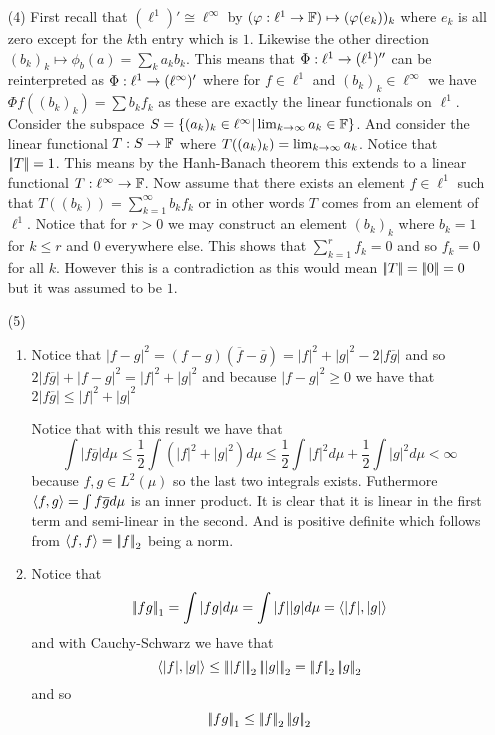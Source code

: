 \documentclass[12pt]{amsart}
\begin{document}
\begin{itemize}
\begin{enumerate}[label=(\alph*)]
   \end{enumerate}

   \item[(4)] %
   First recall that $(\ell^1)'\cong \ell^\infty$ by 
   $(\varphi:\ell^1\rightarrow \mathbb{F})\mapsto(\varphi(e_k))_k$ where $e_k$ is all zero except for the $k$th entry which is $1$.
   Likewise the other direction $(b_k)_k\mapsto \phi_b(a)=\sum_ka_kb_k$. This means that $\Phi:\ell^1\rightarrow (\ell^1)''$ 
   can be reinterpreted as $\Phi:\ell^1\rightarrow (\ell^\infty)'$ where for $f\in\ell^1$ and $(b_k)_k\in\ell^\infty$ we have $\Phi f ((b_k)_k)=\sum b_k f_k$ as these are exactly the linear functionals on $\ell^1$.
   Consider the subspace $S=\{(a_k)_k\in\ell^\infty| \lim_{k\rightarrow\infty}a_k\in\mathbb{F}\}$. 
   And consider the linear functional
   $T:S\rightarrow\mathbb{F}$ where $T((a_k)_k)=\lim_{k\rightarrow \infty}a_k$. Notice that $\norm{T}=1$. This means
   by the Hanh-Banach theorem this extends to a linear functional $T:\ell^\infty\rightarrow \mathbb{F}$.
   Now assume that there exists an element $f\in\ell^1$ such that $T((b_k))=\sum_{k=1}^\infty b_kf_k$
   or in other words $T$ comes from an element of $\ell^1$. Notice that for $r>0$ we may 
   construct an element $(b_k)_k$ where $b_k=1$ for $k\leq r$ and $0$ everywhere else.
   This shows that $\sum_{k=1}^r f_k = 0$ and so $f_k=0$ for all $k$. 
   However this is a contradiction as this would mean $\norm{T}=\norm{0}=0$ but it 
   was assumed to be $1$.


   \item[(5)] 
      \begin{enumerate}[label=(\alph*)]
         \item Notice that $|f-g|^2=(f-g)(\overline{f}-\overline{g})=|f|^2+|g|^2-2|f\overline{g}|$ and so
              $2|f\overline{g}|+|f-g|^2=|f|^2+|g|^2$ and because $|f-g|^2\geq 0$ we have that
              $2|f\overline{g}|\leq|f|^2+|g|^2$
         
         
         Notice that with this result we have that 
         \[\int|f\overline{g}|d\mu\leq\frac{1}{2}\int(|f|^2+|g|^2)d\mu \leq \frac{1}{2}\int|f|^2d\mu +\frac{1}{2}\int|g|^2d\mu <\infty\]
         because $f,g\in L^2(\mu)$ so the last two integrals exists. Futhermore $\left\langle f,g \right\rangle=\int f\overline{g} d\mu$ is an inner product. 
         It is clear that it is linear in the first term and semi-linear in the second. And is positive definite which follows from $\ip{f,f}=\norm{f}_2$ being a norm.

         \item Notice that 
         \[\norm{fg}_1=\int|fg|d\mu =\int |f||g|d\mu = \ip{|f|,|g|}\]
         and with Cauchy-Schwarz we have that
         \[\ip{|f|,|g|}\leq \norm{|f|}_2\norm{|g|}_2=\norm{f}_2\norm{g}_2\]
         and so 
         \[\norm{fg}_1\leq\norm{f}_2\norm{g}_2\]
      \end{enumerate}


\end{itemize}
\end{document}
